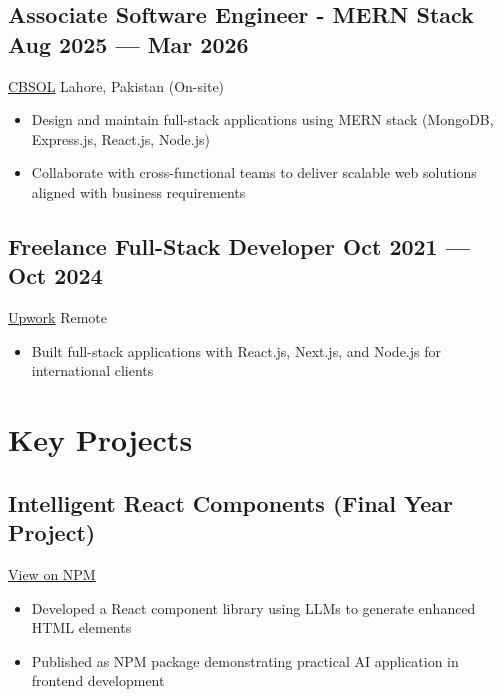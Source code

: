 \documentclass[a4,10pt]{article}
\newcommand{\subtext}[1]{
#1\par\vspace{-0.2cm}}
\newenvironment{zitemize}{
\begin{itemize}\itemsep0pt \parskip0pt \parsep1pt}
{\end{itemize}\vspace{-0.5cm}}
\newcommand{\citelink}[2]{\textcolor{UI_blue}{\href{#1}{\small #2}}}
\begin{document}
\subsection*{Associate Software Engineer - MERN Stack {\normalsize\normalfont} \hfill Aug 2025 --- Mar 2026} 
\subtext{\href{https://cbsol.ai/}{CBSOL} \hfill Lahore, Pakistan (On-site)} 
    \begin{zitemize}
        \item Design and maintain full-stack applications using MERN stack (MongoDB, Express.js, React.js, Node.js)
        \item Collaborate with cross-functional teams to deliver scalable web solutions aligned with business requirements
    \end{zitemize}

\subsection*{Freelance Full-Stack Developer {\normalsize\normalfont} \hfill Oct 2021 --- Oct 2024} 
\subtext{\href{https://www.upwork.com/freelancers/~014857361c14554206}{Upwork} \hfill Remote} 
    \begin{zitemize}
        \item Built full-stack applications with React.js, Next.js, and Node.js for international clients
    \end{zitemize}

\vspace{0.05cm}

\section{Key Projects}

\subsection*{Intelligent React Components {\normalsize\normalfont (Final Year Project)}} 
\citelink{https://www.npmjs.com/package/intelligent-react-components}{View on NPM}
    \begin{zitemize}
        \item Developed a React component library using LLMs to generate enhanced HTML elements
        \item Published as NPM package demonstrating practical AI application in frontend development
    \end{zitemize}
\end{document}
